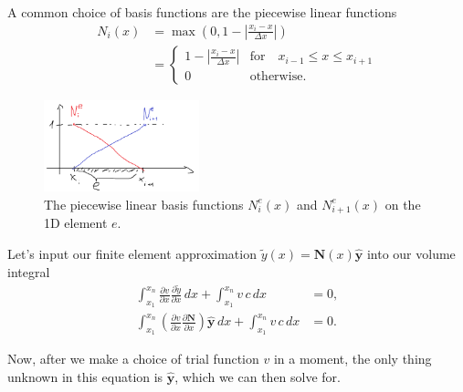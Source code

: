 \documentclass[acmtog]{acmart}
\begin{document}
A common choice of basis functions are the piecewise linear functions
%
\begin{align}
  N_i (x) & = \max\left( 0, 1- \left\lvert  \frac{x_i - x}{\Delta x}  \right\rvert \right)                                       \\
          & = \begin{cases}
                \displaystyle 1- \left\lvert  \frac{x_i - x}{\Delta x} \right\rvert & \text{for} \quad x_{i-1} \leq x \leq x_{i+1} \\
                0                                                                   & \mathrm{otherwise.}
              \end{cases}
\end{align}
%
\begin{figure}[H]
  \centering
  \includegraphics[width=0.4\textwidth]{Images/img_0.png}
  \caption{The piecewise linear basis functions $N^e_i(x)$ and $N^e_{i+1}(x)$ on the 1D element $e$.}
\end{figure}
%

Let's input our finite element approximation $\tilde{y}(x) = \boldsymbol N(x) \boldsymbol{\hat{y}}$ into our volume integral
%
\begin{align}
  \int_{x_1}^{x_n} \frac{ \partial v }{ \partial x } \frac{ \partial \tilde{y} }{ \partial x } \, dx + \int_{x_1}^{x_n} v \, c \, dx                                         & = 0, \\
  \int_{x_1}^{x_n} \left( \frac{ \partial v }{ \partial x } \frac{ \partial \boldsymbol N}{ \partial x } \right) \boldsymbol {\hat{y}} \, dx + \int_{x_1}^{x_n} v \, c \, dx & = 0.
\end{align}

Now, after we make a choice of trial function $v$ in a moment, the only thing unknown in this equation is $\boldsymbol{\hat{y}}$, which we can then solve for.
\end{document}
